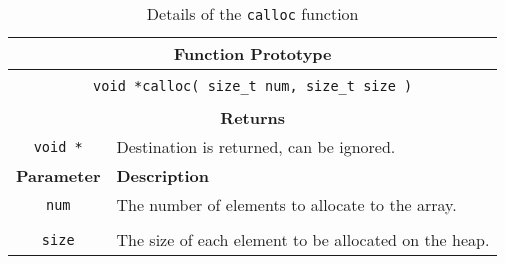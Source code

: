 
\begin{table}[h]
  \centering
  \begin{tabular}{|c|p{9.5cm}|}
    \hline
    \multicolumn{2}{|c|}{\textbf{Function Prototype}} \\
    \hline
    \multicolumn{2}{|c|}{} \\
    \multicolumn{2}{|c|}{\texttt{void *calloc( size\_t num, size\_t size )}} \\
    \multicolumn{2}{|c|}{} \\
    \hline
    \multicolumn{2}{|c|}{\textbf{Returns}} \\
    \hline
    \texttt{void *} & Destination is returned, can be ignored. \\
    \hline
    \textbf{Parameter} & \textbf{Description} \\
    \hline
    \texttt{ num } & The number of elements to allocate to the array.\\
    & \\
    \texttt{ size } & The size of each element to be allocated on the heap. \\
    \hline
  \end{tabular}
  \caption{Details of the \texttt{calloc} function}
  \label{tbl:calloc}
\end{table}



